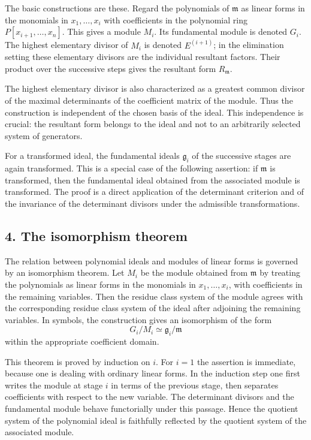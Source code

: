 \documentclass[11pt]{article}
\begin{document}
The basic constructions are these. Regard the polynomials of $\mathfrak m$ as linear forms in the monomials in $x_1,\ldots,x_i$ with coefficients in the polynomial ring $P[x_{i+1},\ldots,x_n]$. This gives a module $M_i$. Its fundamental module is denoted $G_i$. The highest elementary divisor of $M_i$ is denoted $E^{(i+1)}$; in the elimination setting these elementary divisors are the individual resultant factors. Their product over the successive steps gives the resultant form $R_{\mathfrak m}$.

The highest elementary divisor is also characterized as a greatest common divisor of the maximal determinants of the coefficient matrix of the module. Thus the construction is independent of the chosen basis of the ideal. This independence is crucial: the resultant form belongs to the ideal and not to an arbitrarily selected system of generators.

For a transformed ideal, the fundamental ideals $\mathfrak g_i$ of the successive stages are again transformed. This is a special case of the following assertion: if $\mathfrak m$ is transformed, then the fundamental ideal obtained from the associated module is transformed. The proof is a direct application of the determinant criterion and of the invariance of the determinant divisors under the admissible transformations.

\subsection{4. The isomorphism theorem}

The relation between polynomial ideals and modules of linear forms is governed by an isomorphism theorem. Let $M_i$ be the module obtained from $\mathfrak m$ by treating the polynomials as linear forms in the monomials in $x_1,
\ldots,x_i$, with coefficients in the remaining variables. Then the residue class system of the module agrees with the corresponding residue class system of the ideal after adjoining the remaining variables. In symbols, the construction gives an isomorphism of the form
\[
  G_i/M_i \simeq \mathfrak g_i/\mathfrak m
\]
within the appropriate coefficient domain.

This theorem is proved by induction on $i$. For $i=1$ the assertion is immediate, because one is dealing with ordinary linear forms. In the induction step one first writes the module at stage $i$ in terms of the previous stage, then separates coefficients with respect to the new variable. The determinant divisors and the fundamental module behave functorially under this passage. Hence the quotient system of the polynomial ideal is faithfully reflected by the quotient system of the associated module.
\end{document}
